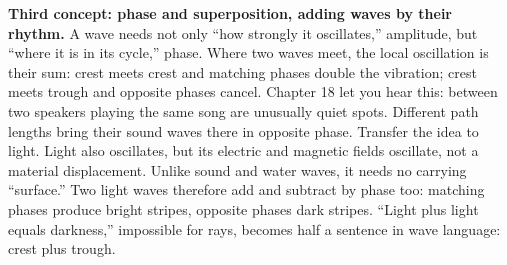 \begin{mainline}
\textbf{Third concept: phase and superposition, adding waves by their rhythm.} A wave needs not only ``how strongly it oscillates,'' amplitude, but ``where it is in its cycle,'' phase. Where two waves meet, the local oscillation is their sum: crest meets crest and matching phases double the vibration; crest meets trough and opposite phases cancel. Chapter 18 let you hear this: between two speakers playing the same song are unusually quiet spots. Different path lengths bring their sound waves there in opposite phase. Transfer the idea to light. Light also oscillates, but its electric and magnetic fields oscillate, not a material displacement. Unlike sound and water waves, it needs no carrying ``surface.'' Two light waves therefore add and subtract by phase too: matching phases produce bright stripes, opposite phases dark stripes. ``Light plus light equals darkness,'' impossible for rays, becomes half a sentence in wave language: crest plus trough.
\end{mainline}

\begin{center}
\end{center}


